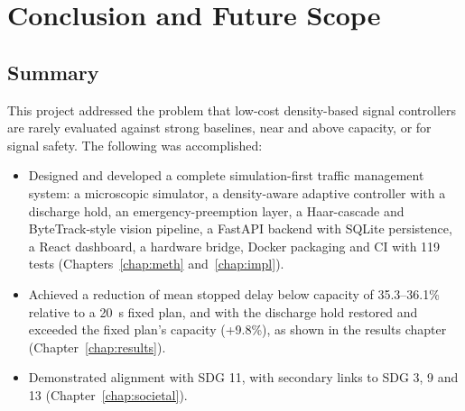 \chapter{Conclusion and Future Scope}
\label{chap:conc}

\section{Summary}
This project addressed the problem that low-cost density-based signal controllers are rarely evaluated against strong baselines, near and above capacity, or for signal safety. The following was accomplished:
\begin{itemize}
  \item Designed and developed a complete simulation-first traffic management system: a microscopic simulator, a density-aware adaptive controller with a discharge hold, an emergency-preemption layer, a Haar-cascade and ByteTrack-style vision pipeline, a FastAPI backend with SQLite persistence, a React dashboard, a hardware bridge, Docker packaging and CI with 119 tests (Chapters~\ref{chap:meth} and~\ref{chap:impl}).
  \item Achieved a reduction of mean stopped delay below capacity of 35.3--36.1\% relative to a 20~s fixed plan, and with the discharge hold restored and exceeded the fixed plan's capacity (+9.8\%), as shown in the results chapter (Chapter~\ref{chap:results}).
  \item Demonstrated alignment with SDG 11, with secondary links to SDG 3, 9 and 13 (Chapter~\ref{chap:societal}).
\end{itemize}


